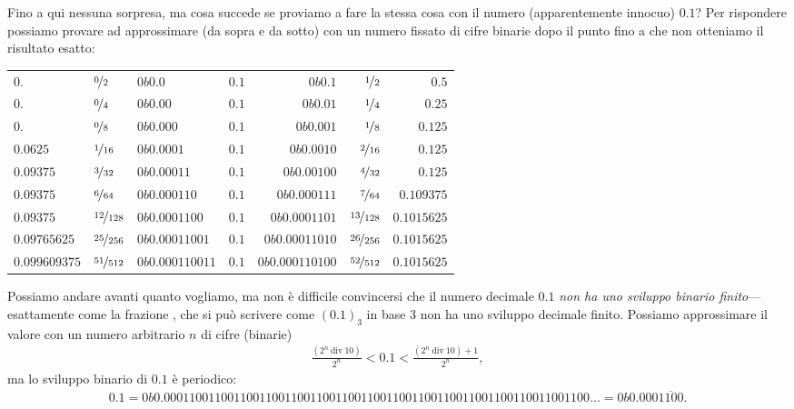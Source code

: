 Fino a qui nessuna sorpresa, ma cosa succede se proviamo a fare la stessa cosa
con il numero (apparentemente innocuo) $0.1$? Per rispondere possiamo provare
ad approssimare (da sopra e da sotto) con un numero fissato di cifre
binarie dopo il punto fino a che non otteniamo il risultato esatto:

\begin{center}
  \begin{tabular}{lllcrrr}
  $0.$ & $\nicefrac{0}{2}$ & $0b0.0$ & $0.1$ & $0b0.1$ & $\nicefrac{1}{2}$ & $0.5$\\
  $0.$ & $\nicefrac{0}{4}$ & $0b0.00$ & $0.1$ & $0b0.01$ & $\nicefrac{1}{4}$ & $0.25$\\
  $0.$ & $\nicefrac{0}{8}$ & $0b0.000$ & $0.1$ & $0b0.001$ & $\nicefrac{1}{8}$ & $0.125$\\
  $0.0625$ & $\nicefrac{1}{16}$ & $0b0.0001$ & $0.1$ & $0b0.0010$ & $\nicefrac{2}{16}$ & $0.125$\\
  $0.09375$ & $\nicefrac{3}{32}$ & $0b0.00011$ & $0.1$ & $0b0.00100$ & $\nicefrac{4}{32}$ & $0.125$\\
  $0.09375$ & $\nicefrac{6}{64}$ & $0b0.000110$ & $0.1$ & $0b0.000111$ & $\nicefrac{7}{64}$ & $0.109375$\\
  $0.09375$ & $\nicefrac{12}{128}$ & $0b0.0001100$ & $0.1$ & $0b0.0001101$ & $\nicefrac{13}{128}$ & $0.1015625$\\
  $0.09765625$ & $\nicefrac{25}{256}$ & $0b0.00011001$ & $0.1$ & $0b0.00011010$ & $\nicefrac{26}{256}$ & $0.1015625$\\
  $0.099609375$ & $\nicefrac{51}{512}$ & $0b0.000110011$ & $0.1$ & $0b0.000110100$ & $\nicefrac{52}{512}$ & $0.1015625$\\
  \end{tabular}
\end{center}
Possiamo andare avanti quanto vogliamo, ma non è difficile convincersi che
il numero decimale $0.1$ \emph{non ha uno sviluppo binario finito}---esattamente
come la frazione , che si può scrivere come $(0.1)_3$ in base
$3$ non ha uno sviluppo decimale finito. Possiamo approssimare il valore con un
numero arbitrario $n$ di cifre (binarie)
\begin{align*}
  \frac{(2^n~\text{div}~10)}{2^n} < 0.1 <   \frac{(2^n~\text{div}~10) + 1}{2^n},
\end{align*}
ma lo sviluppo binario di $0.1$ è periodico:
\begin{align*}
  0.1 = 0b0.0001100110011001100110011001100110011001100110011001100110011001100
  \ldots = 0b0.000\overline{1100}.
\end{align*}

